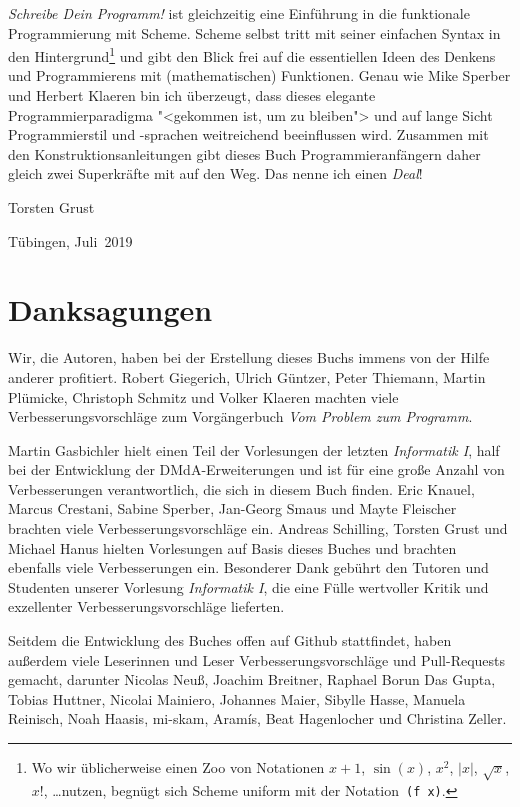\textit{Schreibe Dein Programm!} ist gleichzeitig eine Einführung in die
funktionale Programmierung mit Scheme.  Scheme selbst tritt mit seiner
einfachen Syntax in den Hintergrund\footnote{Wo wir üblicherweise einen
Zoo von Notationen $x+1$, $\sin(x)$, $x^2$, $\vert x\vert$, $\sqrt{x}$,
$x!$, \dots nutzen, begnügt sich Scheme uniform mit der
Notation~\texttt{(f~x)}.} und gibt den Blick frei auf die essentiellen
Ideen des Denkens und Programmierens mit (mathematischen) Funktionen.
Genau wie Mike Sperber und Herbert Klaeren bin ich überzeugt, dass
dieses elegante Programmierparadigma "<gekommen ist, um zu bleiben"> und
auf lange Sicht Programmierstil und -sprachen weitreichend beeinflussen
wird.  Zusammen mit den Konstruktionsanleitungen gibt dieses Buch
Programmieranfängern daher gleich zwei Superkräfte mit auf den Weg.  Das
nenne ich einen \emph{Deal}!

\begin{flushright}
  Torsten Grust

  Tübingen, Juli~2019
\end{flushright}

\section*{Danksagungen}

Wir, die Autoren, haben bei der Erstellung dieses Buchs immens von der
Hilfe anderer profitiert.  Robert Giegerich, Ulrich Güntzer, Peter
Thiemann, Martin Plümicke, Christoph Schmitz und Volker Klaeren
machten viele Verbesserungsvorschläge zum Vorgängerbuch \textit{Vom
  Problem zum Programm}.

Martin Gasbichler hielt einen Teil der Vorlesungen der letzten
\textit{Informatik I}, half bei der Entwicklung der DMdA-Erweiterungen
und ist für eine große Anzahl von Verbesserungen verantwortlich, die
sich in diesem Buch finden.  Eric Knauel, Marcus Crestani, Sabine
Sperber, Jan-Georg Smaus und Mayte Fleischer brachten viele Verbesserungsvorschläge
ein.  Andreas Schilling, Torsten Grust und Michael Hanus hielten
Vorlesungen auf Basis dieses Buches und brachten ebenfalls viele
Verbesserungen ein.
Besonderer Dank gebührt den Tutoren und Studenten unserer Vorlesung
\textit{Informatik I}, die eine
Fülle wertvoller Kritik und exzellenter Verbesserungsvorschläge
lieferten.

Seitdem die Entwicklung des Buches offen auf Github stattfindet, haben
außerdem viele Leserinnen und Leser Verbesserungsvorschläge und
Pull-Requests gemacht, darunter Nicolas Neuß, Joachim Breitner,
Raphael Borun Das Gupta, Tobias Huttner, Nicolai Mainiero, Johannes
Maier, Sibylle Hasse, Manuela Reinisch, Noah Haasis, mi-skam,
Aramís, Beat Hagenlocher und Christina Zeller.

